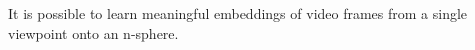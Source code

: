 
It is possible to learn meaningful embeddings of video frames from a single viewpoint onto an n-sphere.

